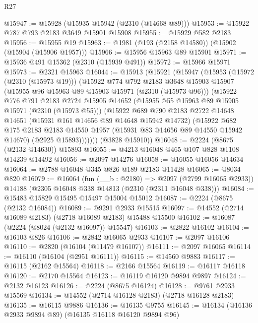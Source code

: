 \begin{lexlean}{R27}
\begin{coremodule}
@15947 := @15928 (@15935 @15942 (@2310 (@14668 @89)))
@15953 := @15922 @787 @793 @2183 @3649 @15901 @15908
@15955 := @15929 @582 @2183
@15956 := @15955 @19
@15963 := @1981 (@193 (@2158 @14580)) (@15902 (@15904 (@15906 @1957)))
@15966 := @15956 @15963 @89 @15901
@15971 := @15936 @491 @15362 (@2310 (@15939 @491))
@15972 := @15966 @15971
@15973 := @2321 @15963
@16044 := @15913
    (@15921
      (@15947
        (@15953
          (@15972 (@2310 (@15973 @19)))
          (@15922
            @774
            @792
            @2183
            @3648
            @15903
            @15907
            (@15955 @96 @15963 @89 @15903 @15971 (@2310 (@15973 @96)))
            (@15922
              @776
              @791
              @2183
              @2724
              @15905
              @14652
              (@15955 @55 @15963 @89 @15905 @15971 (@2310 (@15973 @55)))
              (@15922
                @689
                @790
                @2183
                @2722
                @14648
                @14651
                (@15931 @161 @14656 @89 @14648 @15942 @14732)
                (@15922
                  @682
                  @175
                  @2183
                  @2183
                  @14550
                  @1957
                  (@15931 @83 @14656 @89 @14550 @15942 @14670)
                  (@2925 @15893)))))))
      (@3828 @15910))
@16048 := @2224 (@8675 (@2132 @14630)) @15893
@16055 := @4213 @16048 @465 @107 @828 @1108 @14239 @14492
@16056 := @2097 @14276
@16058 := @16055 @16056 @14634
@16064 := @2788 @16048 @345 @826 @189 @2183 @11428
@16065 := @8034 @820
@16079 := @16064
    (fun (__b : @2180) => @2097 (@2799 @16065 @2933))
    @14188
    (@2305 @16048 @338 @14813 (@2310 (@2311 @16048 @338)))
@16084 := @15483 @15829 @15495 @15497 @15004 @15012
@16087 := @2224 (@8675 (@2132 @16084))
@16089 := @9291 @2933 @15515
@16097 := @14552 (@2714 @16089 @2183) (@2718 @16089 @2183) @15488 @15500
@16102 := @16087 (@2224 (@8024 (@2132 @16097)) @15547)
@16103 := @2822 @16102
@16104 := @16103 @826
@16106 := @2842 @16065 @2933
@16107 := @2097 @16106
@16110 := @2820 (@16104 (@11479 @16107))
@16111 := @2097 @16065
@16114 := @16110 (@16104 (@2951 @16111))
@16115 := @14560 @9883
@16117 := @16115 (@2162 @15564)
@16118 := @2166 @15564
@16119 := @16117 @16118
@16120 := @2170 @15564
@16123 := @16119 @16120 @9894 @9897
@16124 := @2132 @16123
@16126 := @2224 (@8675 @16124)
@16128 := @9761 @2933 @15569
@16134 := @14552 (@2714 @16128 @2183) (@2718 @16128 @2183)
@16135 := @16115 @9886
@16136 := @16135 @9755
@16145 := @16134 (@16136 @2933 @9894 @89) (@16135 @16118 @16120 @9894 @96)

\end{coremodule}
\end{lexlean}
